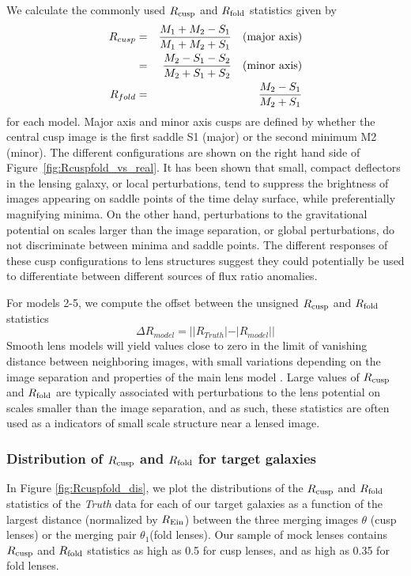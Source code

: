\noindent We calculate the commonly used $R_{\rm{cusp}}$ and $R_{\rm{fold}}$ statistics given by
%
\begin{eqnarray} \label{eq:rcuspfold1}
R_{cusp} &=& \dfrac{M_{1} + M_{2} - S_{1}}{M_{1} + M_{2} + S_{1}} \quad \rm{(major \ axis)} \\ \nonumber &=& \dfrac{M_2 - S_{1} - S_{2}}{M_{2} + S_{1} + S_{2}} \quad \rm{(minor \ axis)} \\\label{eq:rcuspfold2}R_{fold} &=& \frac{M_{2} - S_{1}}{M_{2} + S_{1}}
\end{eqnarray}
for each model. Major axis and minor axis cusps are defined by whether the central cusp image is the first saddle S1 (major) or the second minimum M2 (minor). The different configurations are shown on the right hand side of Figure~\ref{fig:Rcuspfold_vs_real}. It has been shown \cite{Schechter++02,Keeton03b} that small, compact deflectors in the lensing galaxy, or local perturbations, tend to suppress the brightness of images appearing on saddle points of the time delay surface, while preferentially magnifying minima. On the other hand, perturbations to the gravitational potential on scales larger than the image separation, or global perturbations, do not discriminate between minima and saddle points. The different responses of these cusp configurations to lens structures suggest they could potentially be used to differentiate between different sources of flux ratio anomalies.

For models 2-5, we compute the offset between the unsigned $R_{\rm{cusp}}$ and $R_{\rm{fold}}$ statistics
\begin{equation}
\nonumber \Delta R_{model} = ||R_{Truth}|- |R_{model}|| 
\end{equation}
Smooth lens models will yield values close to zero in the limit of vanishing distance between neighboring images, with small variations depending on the image separation and properties of the main lens model \cite{Keeton03,Keeton05}. Large values of $R_{\rm{cusp}}$ and $R_{\rm{fold}}$ are typically associated with perturbations to the lens potential on scales smaller than the image separation, and as such, these statistics are often used as a indicators of small scale structure near a lensed image.

\subsubsection{Distribution of $R_{\rm{cusp}}$ and $R_{\rm{fold}}$ for target galaxies}
In Figure \ref{fig:Rcuspfold_dis}, we plot the distributions of the $R_{\rm{cusp}}$ and $R_{\rm{fold}}$ statistics of the \textit{Truth} data for each of our target galaxies as a function of the largest distance (normalized by $R_{\rm{Ein}}$) between the three merging images $\theta$ (cusp lenses) or the merging pair $\theta_1$(fold lenses). Our sample of mock lenses contains $R_{\rm{cusp}}$ and $R_{\rm{fold}}$ statistics as high as 0.5 for cusp lenses, and as high as 0.35 for fold lenses.

